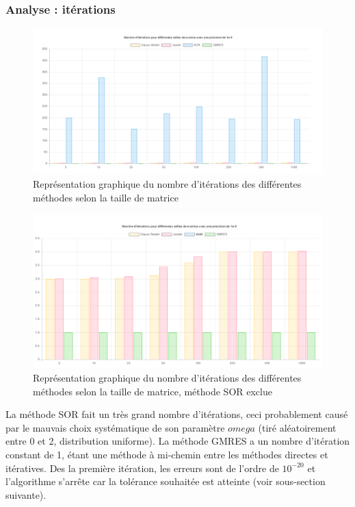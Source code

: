 \subsubsection{Analyse : itérations}
\begin{figure}[H]
	\includegraphics[width=\linewidth]{images/nbIters.PNG}
	\caption{Représentation graphique du nombre d'itérations des différentes méthodes selon la taille de matrice}
\end{figure}

\begin{figure}[H]
	\includegraphics[width=\linewidth]{images/nbItersSansSOR.PNG}
	\caption{Représentation graphique du nombre d'itérations des différentes méthodes selon la taille de matrice, méthode SOR exclue}
\end{figure}

La méthode SOR fait un très grand nombre d'itérations, ceci probablement causé par le mauvais choix systématique de son paramètre $omega$ (tiré aléatoirement entre 0 et 2, distribution uniforme). La méthode GMRES a un nombre d'itération constant de 1, étant une méthode à mi-chemin entre les méthodes directes et itératives. Des la première itération, les erreurs sont de l'ordre de $10^{-20}$ et l'algorithme s'arrête car la tolérance souhaitée est atteinte (voir sous-section suivante).

